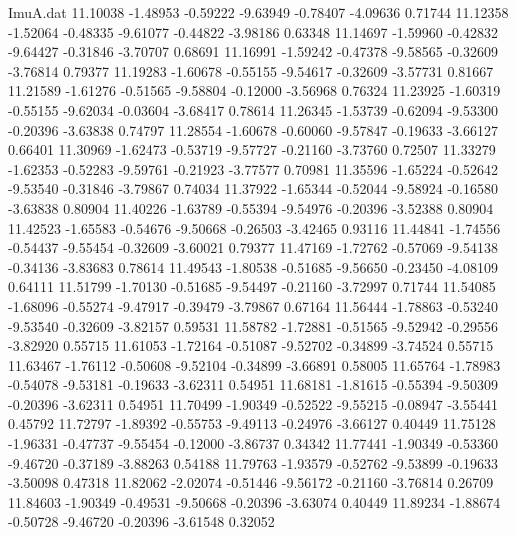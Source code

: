 \begin{filecontents}{ImuA.dat}
  11.10038   -1.48953   -0.59222   -9.63949   -0.78407   -4.09636    0.71744
  11.12358   -1.52064   -0.48335   -9.61077   -0.44822   -3.98186    0.63348
  11.14697   -1.59960   -0.42832   -9.64427   -0.31846   -3.70707    0.68691
  11.16991   -1.59242   -0.47378   -9.58565   -0.32609   -3.76814    0.79377
  11.19283   -1.60678   -0.55155   -9.54617   -0.32609   -3.57731    0.81667
  11.21589   -1.61276   -0.51565   -9.58804   -0.12000   -3.56968    0.76324
  11.23925   -1.60319   -0.55155   -9.62034   -0.03604   -3.68417    0.78614
  11.26345   -1.53739   -0.62094   -9.53300   -0.20396   -3.63838    0.74797
  11.28554   -1.60678   -0.60060   -9.57847   -0.19633   -3.66127    0.66401
  11.30969   -1.62473   -0.53719   -9.57727   -0.21160   -3.73760    0.72507
  11.33279   -1.62353   -0.52283   -9.59761   -0.21923   -3.77577    0.70981
  11.35596   -1.65224   -0.52642   -9.53540   -0.31846   -3.79867    0.74034
  11.37922   -1.65344   -0.52044   -9.58924   -0.16580   -3.63838    0.80904
  11.40226   -1.63789   -0.55394   -9.54976   -0.20396   -3.52388    0.80904
  11.42523   -1.65583   -0.54676   -9.50668   -0.26503   -3.42465    0.93116
  11.44841   -1.74556   -0.54437   -9.55454   -0.32609   -3.60021    0.79377
  11.47169   -1.72762   -0.57069   -9.54138   -0.34136   -3.83683    0.78614
  11.49543   -1.80538   -0.51685   -9.56650   -0.23450   -4.08109    0.64111
  11.51799   -1.70130   -0.51685   -9.54497   -0.21160   -3.72997    0.71744
  11.54085   -1.68096   -0.55274   -9.47917   -0.39479   -3.79867    0.67164
  11.56444   -1.78863   -0.53240   -9.53540   -0.32609   -3.82157    0.59531
  11.58782   -1.72881   -0.51565   -9.52942   -0.29556   -3.82920    0.55715
  11.61053   -1.72164   -0.51087   -9.52702   -0.34899   -3.74524    0.55715
  11.63467   -1.76112   -0.50608   -9.52104   -0.34899   -3.66891    0.58005
  11.65764   -1.78983   -0.54078   -9.53181   -0.19633   -3.62311    0.54951
  11.68181   -1.81615   -0.55394   -9.50309   -0.20396   -3.62311    0.54951
  11.70499   -1.90349   -0.52522   -9.55215   -0.08947   -3.55441    0.45792
  11.72797   -1.89392   -0.55753   -9.49113   -0.24976   -3.66127    0.40449
  11.75128   -1.96331   -0.47737   -9.55454   -0.12000   -3.86737    0.34342
  11.77441   -1.90349   -0.53360   -9.46720   -0.37189   -3.88263    0.54188
  11.79763   -1.93579   -0.52762   -9.53899   -0.19633   -3.50098    0.47318
  11.82062   -2.02074   -0.51446   -9.56172   -0.21160   -3.76814    0.26709
  11.84603   -1.90349   -0.49531   -9.50668   -0.20396   -3.63074    0.40449
  11.89234   -1.88674   -0.50728   -9.46720   -0.20396   -3.61548    0.32052

\end{filecontents}
